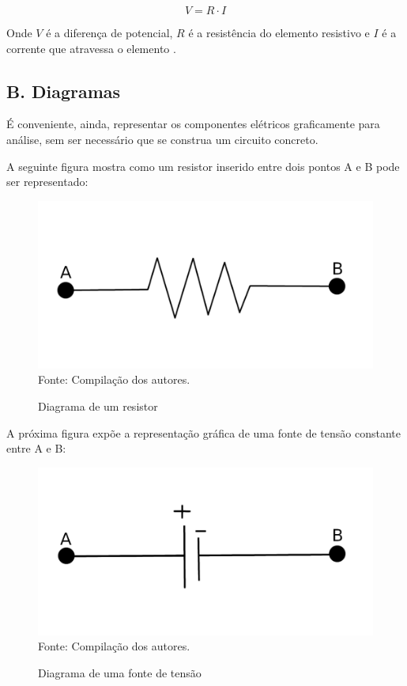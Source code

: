 \documentclass[twocolumn, 10pt,a4paper]{extarticle}
\begin{document}
\[
V = R\cdot I
\]

Onde $V$ é a diferença de potencial, $R$ é a resistência do elemento resistivo e $I$ é a corrente que atravessa o elemento \cite[p. 28]{sadiku}.

\subsection*{B. \quad Diagramas}

É conveniente, ainda, representar os componentes elétricos graficamente para análise, sem ser necessário que se construa um circuito concreto.

A seguinte figura mostra como um resistor inserido entre dois pontos A e B pode ser representado:

\begin{figure}[H]
	\caption{Diagrama de um resistor} 
	\centering
	\includegraphics[scale=0.7]{res1}
	\\ Fonte: Compilação dos autores.
\end{figure}

A próxima figura expõe a representação gráfica de uma fonte de tensão constante entre A e B:

\begin{figure}[H]
	\caption{Diagrama de uma fonte de tensão} 
	\centering
	\includegraphics[scale=0.7]{vcc1}
	\\ Fonte: Compilação dos autores.
\end{figure}
\end{document}
